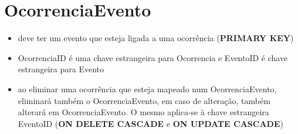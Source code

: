\documentclass[article, a4paper, 12pt, oneside]{memoir}
\begin{document}
\section*{OcorrenciaEvento}
\begin{itemize}
	\item deve ter um evento que esteja ligada a uma ocorrência (\textbf{PRIMARY KEY})
	\item OcorrenciaID é uma chave estrangeira para Ocorrencia e EventoID é chave estrangeira para Evento
	\item ao eliminar uma ocorrência que esteja mapeado num OcorrenciaEvento, eliminará também o OcorrenciaEvento, em caso de alteração, também alterará em OcorrenciaEvento. O mesmo aplica-se à chave estrangeira EventoID (\textbf{ON DELETE CASCADE} e \textbf{ON UPDATE CASCADE})
\end{itemize}
\end{document}
